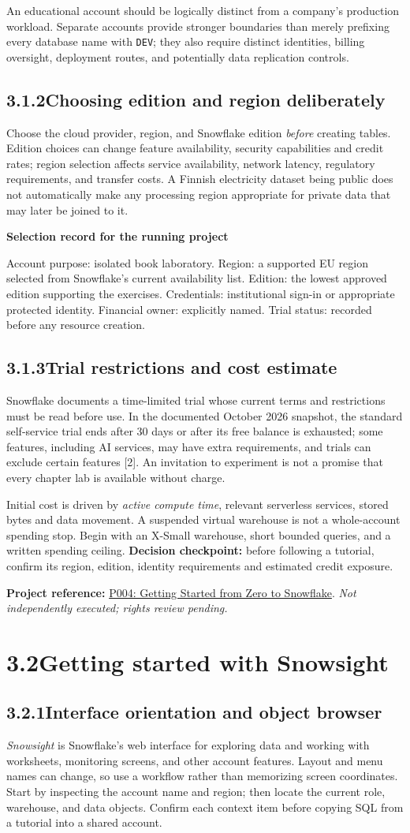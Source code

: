 \documentclass[11pt,twoside]{article}
\newcommand{\topic}[2]{\subsection*{#1\quad #2}}
\newcommand{\repo}[2]{\par\begingroup\fontsize{8.0}{9.6}\selectfont\sffamily\color{inkgray}\textbf{Project reference:} \href{#2}{#1}. \textit{Not independently executed; rights review pending.}\par\endgroup}
\begin{document}
An educational account should be logically distinct from a company's production workload. Separate accounts provide stronger boundaries than merely prefixing every database name with \texttt{DEV}; they also require distinct identities, billing oversight, deployment routes, and potentially data replication controls.

\topic{3.1.2}{Choosing edition and region deliberately}
Choose the cloud provider, region, and Snowflake edition \emph{before} creating tables. Edition choices can change feature availability, security capabilities and credit rates; region selection affects service availability, network latency, regulatory requirements, and transfer costs. A Finnish electricity dataset being public does not automatically make any processing region appropriate for private data that may later be joined to it.

\begin{whitebox}
\textbf{Selection record for the running project}\par
Account purpose: isolated book laboratory. Region: a supported EU region selected from Snowflake's current availability list. Edition: the lowest approved edition supporting the exercises. Credentials: institutional sign-in or appropriate protected identity. Financial owner: explicitly named. Trial status: recorded before any resource creation.
\end{whitebox}
\topic{3.1.3}{Trial restrictions and cost estimate}
Snowflake documents a time-limited trial whose current terms and restrictions must be read before use. In the documented October 2026 snapshot, the standard self-service trial ends after 30 days or after its free balance is exhausted; some features, including AI services, may have extra requirements, and trials can exclude certain features [2]. An invitation to experiment is not a promise that every chapter lab is available without charge.

Initial cost is driven by \emph{active compute time}, relevant serverless services, stored bytes and data movement. A suspended virtual warehouse is not a whole-account spending stop. Begin with an X-Small warehouse, short bounded queries, and a written spending ceiling. \textbf{Decision checkpoint:} before following a tutorial, confirm its region, edition, identity requirements and estimated credit exposure.
\repo{P004: Getting Started from Zero to Snowflake}{https://github.com/Snowflake-Labs/sfguide-getting-started-from-zero-to-snowflake}

\newpage
\section*{3.2\quad Getting started with Snowsight}
\topic{3.2.1}{Interface orientation and object browser}
\emph{Snowsight} is Snowflake's web interface for exploring data and working with worksheets, monitoring screens, and other account features. Layout and menu names can change, so use a workflow rather than memorizing screen coordinates. Start by inspecting the account name and region; then locate the current role, warehouse, and data objects. Confirm each context item before copying SQL from a tutorial into a shared account.
\end{document}
